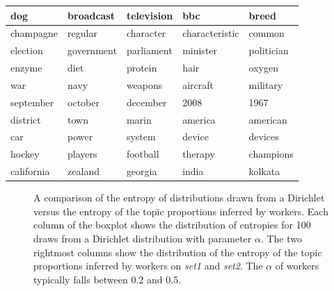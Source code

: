 \begin{table}
{\begin{tabular}{|lllll}
  dog & broadcast & television & bbc & breed \\ \hline 
  champagne & regular & character & characteristic & common \\ \hline 
  election & government & parliament & minister & politician \\ \hline 
  enzyme & diet & protein & hair & oxygen \\ \hline 
  war & navy & weapons & aircraft & military \\ \hline 
  september & october & december & 2008 & 1967 \\ \hline 
  district & town & marin & america & american \\ \hline 
  car & power & system & device & devices \\ \hline 
  hockey & players & football & therapy & champions \\ \hline 
  california & zealand & georgia & india & kolkata \\
\end{tabular}
}
\vspace{0.2in}
\end{table}

\begin{figure}
\centering
{}%

\caption{A comparison of the entropy of distributions drawn from a
  Dirichlet versus the entropy of the topic proportions inferred by
  workers.  Each column of the boxplot shows the distribution of
  entropies for 100 draws from a Dirichlet distribution with parameter
  $\alpha$.  The two rightmost columns show the distribution of the
  entropy of the topic proportions inferred by workers on \emph{set1}
  and \emph{set2}.  The $\alpha$ of workers typically falls between 0.2
  and 0.5.}

\label{fig:entropy}
\end{figure}

